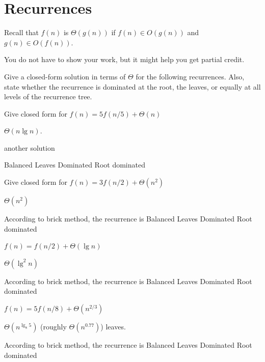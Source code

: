 \section{Recurrences}

Recall that $f(n)$ is $\Theta(g(n))$
if $f(n) \in O(g(n))$ and $g(n) \in O(f(n))$.


\begin{note}
You do not have to show your work, but it might help you get partial credit.
\end{note}

\begin{problem}[40.]
Give a closed-form
solution in terms of $\Theta$ for the following recurrences.  Also, state
whether the recurrence is dominated at the root, the leaves, or
equally at all levels of the recurrence tree.


\ask[10.0]
Give closed form for  
$f(n) = 5f(n/5) + \Theta(n)$


\sol[0.5] 
$\Theta (n \lg n)$.

\sol[1.5]
another solution

\onechoice[8.] 

\choice[1.0] Balanced
\choice[0.4] Leaves Dominated
\choice[0.6] Root dominated 



\ask[2.]
Give closed form for  
$f(n) = 3f(n/2) + \Theta(n^2)$

\sol
$\Theta(n^2)$

\onechoice  According to brick method, the recurrence is
\choice Balanced
\choice Leaves Dominated
\choice* Root dominated

\ask[2.]
$f(n) = f(n/2) + \Theta(\lg n)$

\sol
$\Theta (\lg^2 n)$

\onechoice[10]  According to brick method, the recurrence is
\choice*[1.0] Balanced
\choice[0.2] Leaves Dominated
\choice Root dominated

\ask[2]
$f(n) = 5f(n/8) +\Theta(n^{2/3})$

\sol
$\Theta(n^{\lg_8 5})$ (roughly $\Theta(n^{0.77})$) leaves.

\onechoicesec  According to brick method, the recurrence is
\choice Balanced
\choice* Leaves Dominated
\choice Root dominated

\end{problem}


